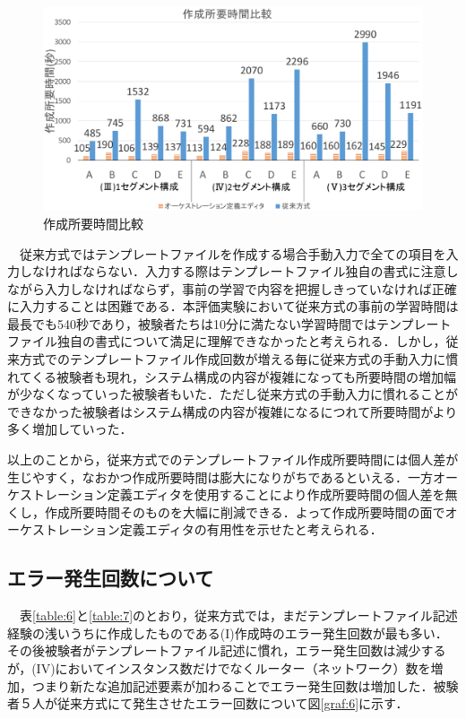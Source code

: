 \documentclass[mingoth]{kut-paper}		%
\begin{document}
		\begin{figure}[H]
			\begin{center}
				\includegraphics[scale=0.42]{Document/Create_alltime.eps}
				\caption{作成所要時間比較}
				\label{graf:9}
			\end{center}
		\end{figure}
		
		　従来方式ではテンプレートファイルを作成する場合手動入力で全ての項目を入力しなければならない．入力する際はテンプレートファイル独自の書式に注意しながら入力しなければならず，事前の学習で内容を把握しきっていなければ正確に入力することは困難である．本評価実験において従来方式の事前の学習時間は最長でも540秒であり，被験者たちは10分に満たない学習時間ではテンプレートファイル独自の書式について満足に理解できなかったと考えられる．しかし，従来方式でのテンプレートファイル作成回数が増える毎に従来方式の手動入力に慣れてくる被験者も現れ，システム構成の内容が複雑になっても所要時間の増加幅が少なくなっていった被験者もいた．ただし従来方式の手動入力に慣れることができなかった被験者はシステム構成の内容が複雑になるにつれて所要時間がより多く増加していった．
		
		 以上のことから，従来方式でのテンプレートファイル作成所要時間には個人差が生じやすく，なおかつ作成所要時間は膨大になりがちであるといえる．一方オーケストレーション定義エディタを使用することにより作成所要時間の個人差を無くし，作成所要時間そのものを大幅に削減できる．よって作成所要時間の面でオーケストレーション定義エディタの有用性を示せたと考えられる．
		
		\subsection{エラー発生回数について}
		　表\ref{table:6}と\ref{table:7}のとおり，従来方式では，まだテンプレートファイル記述経験の浅いうちに作成したものである(I)作成時のエラー発生回数が最も多い．その後被験者がテンプレートファイル記述に慣れ，エラー発生回数は減少するが，(I\hspace{-1pt}V)においてインスタンス数だけでなくルーター（ネットワーク）数を増加，つまり新たな追加記述要素が加わることでエラー発生回数は増加した．被験者５人が従来方式にて発生させたエラー回数について図\ref{graf:6}に示す．
\end{document}
